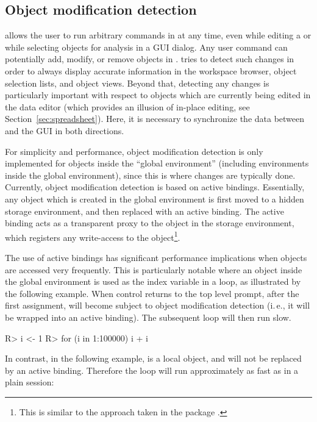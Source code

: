 \subsection{Object modification detection}
\label{sec:technical_omd}
 allows the user to run arbitrary commands in  at any time, even while
editing a  or while selecting objects for analysis in a GUI dialog. Any user
command can potentially add, modify, or remove objects in .  tries to
detect such changes in order to always display accurate information in the
workspace browser, object selection lists, and object views. Beyond that,
detecting any changes is particularly important with respect to objects which
are currently being edited in the data editor (which provides an illusion
of in-place editing, see Section~\ref{sec:spreadsheet}). Here, it is necessary to synchronize
the data between  and the GUI in both directions.

For simplicity and performance, object modification detection is only
implemented for objects inside the ``global environment'' (including environments
inside the global environment), since this is where changes are typically done.
Currently, object modification detection is based on active bindings.
Essentially, any object which is created in the global environment is first
moved to a hidden storage environment, and then replaced with an active binding.
The active binding acts as a transparent proxy to the object in the storage
environment, which registers any write-access to the object\footnote{
    This is similar to the approach taken in the  package \citep{Plate2009}.
}.

The use of active bindings has significant performance implications when
objects are accessed very frequently. This is particularly notable where an
object inside the global environment is used as the index variable in a loop,
as illustrated by the following example. When control returns to the top level
prompt, after the first assignment,  will become subject to object modification
detection (i.\,e., it will be wrapped into an active
binding). The subsequent  loop will then run slow.

\begin{Code}
R> i <- 1
R> for (i in 1:100000) i + i
\end{Code}

In contrast, in the following example,  is a local object, and will not
be replaced by an active binding. Therefore the loop will run approximately as fast
as in a plain  session:

